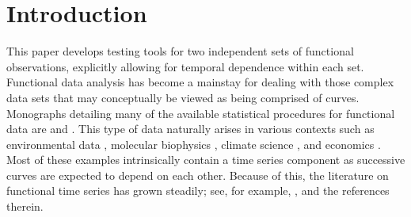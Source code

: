 \documentclass[11pt]{article}
\numberwithin{equation}{section}
\numberwithin{theorem}{section}
\numberwithin{lemma}{section}
\numberwithin{proposition}{section}
\numberwithin{cor}{section}
\numberwithin{definition}{section}
\numberwithin{cons}{section}
\numberwithin{rem}{section}
\numberwithin{exa}{section}
\numberwithin{table}{section}
\numberwithin{figure}{section}
\numberwithin{algo}{section}
\begin{document}
\setlength{\baselineskip}{1.66em}
\section{Introduction}
\label{sec1}
\def\theequation{2.\arabic{equation}}
\setcounter{equation}{0}

This paper develops testing tools for two independent sets of functional observations, explicitly allowing for temporal dependence within each set. Functional data analysis has become a mainstay for dealing with those complex data sets that may conceptually be viewed as being comprised of curves. Monographs detailing many of the available statistical procedures for functional data are \citet{ramsay:silverman:2005} and \citet{horvkoko2012}. This type of data naturally arises in various contexts such as environmental data \citep{aue:dubartnorinho:hormann:2015}, molecular biophysics \citep{tavakoli:panaretos:2016}, climate science \citep{zhang2011,aue:rice:sonmez:2018}, and economics \citep{kowal:matteson:ruppert:2019}. Most of these examples intrinsically contain a time series component as successive curves are expected to depend on each other. Because of this, the literature on functional time series has grown steadily; see, for example, \citet{hoermann2010}, \citet{panaretos:tavakoli:2013} and the references therein.
\end{document}
